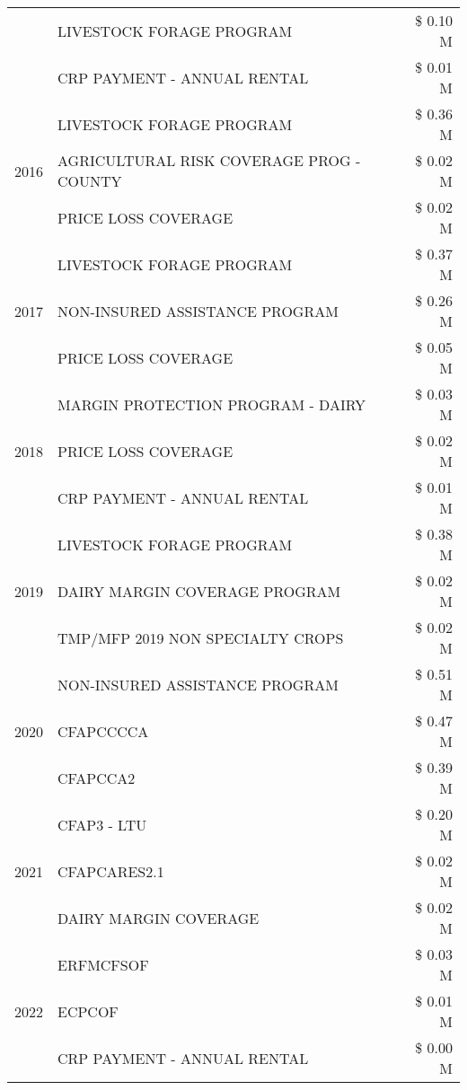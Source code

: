 \begin{tabular}{llr}
 & LIVESTOCK FORAGE PROGRAM & \$ 0.10 M \\
 & CRP PAYMENT - ANNUAL RENTAL & \$ 0.01 M \\
\cline{1-3}
\multirow[t]{3}{*}{2016} & LIVESTOCK FORAGE PROGRAM & \$ 0.36 M \\
 & AGRICULTURAL RISK COVERAGE PROG - COUNTY & \$ 0.02 M \\
 & PRICE LOSS COVERAGE & \$ 0.02 M \\
\cline{1-3}
\multirow[t]{3}{*}{2017} & LIVESTOCK FORAGE PROGRAM & \$ 0.37 M \\
 & NON-INSURED ASSISTANCE PROGRAM & \$ 0.26 M \\
 & PRICE LOSS COVERAGE & \$ 0.05 M \\
\cline{1-3}
\multirow[t]{3}{*}{2018} & MARGIN PROTECTION PROGRAM - DAIRY & \$ 0.03 M \\
 & PRICE LOSS COVERAGE & \$ 0.02 M \\
 & CRP PAYMENT - ANNUAL RENTAL & \$ 0.01 M \\
\cline{1-3}
\multirow[t]{3}{*}{2019} & LIVESTOCK FORAGE PROGRAM & \$ 0.38 M \\
 & DAIRY MARGIN COVERAGE PROGRAM & \$ 0.02 M \\
 & TMP/MFP 2019 NON SPECIALTY CROPS & \$ 0.02 M \\
\cline{1-3}
\multirow[t]{3}{*}{2020} & NON-INSURED ASSISTANCE PROGRAM & \$ 0.51 M \\
 & CFAPCCCCA & \$ 0.47 M \\
 & CFAPCCA2 & \$ 0.39 M \\
\cline{1-3}
\multirow[t]{3}{*}{2021} & CFAP3 - LTU & \$ 0.20 M \\
 & CFAPCARES2.1 & \$ 0.02 M \\
 & DAIRY MARGIN COVERAGE & \$ 0.02 M \\
\cline{1-3}
\multirow[t]{3}{*}{2022} & ERFMCFSOF & \$ 0.03 M \\
 & ECPCOF & \$ 0.01 M \\
 & CRP PAYMENT - ANNUAL RENTAL & \$ 0.00 M \\
\cline{1-3}
\bottomrule
\end{tabular}
